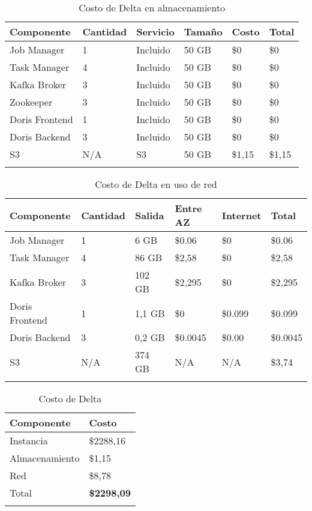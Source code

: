 \begin{longtable}{|p{3cm}|p{2cm}|p{2cm}|p{2cm}|p{2cm}|p{2cm}|}
    \hline
    \textbf{Componente} & \textbf{Cantidad} & \textbf{Servicio} & \textbf{Tamaño} & \textbf{Costo} & \textbf{Total} \\
    \hline
    Job Manager & 1 & Incluido & 50 GB & \$0 & \$0 \\
    \hline
    Task Manager & 4 & Incluido & 50 GB & \$0 & \$0 \\
    \hline
    Kafka Broker & 3 & Incluido & 50 GB & \$0 & \$0 \\
    \hline
    Zookeeper & 3 & Incluido & 50 GB & \$0 & \$0 \\
    \hline
    Doris Frontend & 1 & Incluido & 50 GB & \$0 & \$0 \\
    \hline
    Doris Backend & 3 &  Incluido & 50 GB & \$0 & \$0 \\
    \hline
    S3 & N/A & S3 & 50 GB & \$1,15 & \$1,15 \\
    \hline
    \caption{Costo de Delta en almacenamiento} \\
\end{longtable}

\begin{longtable}{|p{3cm}|p{2cm}|p{2cm}|p{2cm}|p{2cm}|p{2cm}|}
    \hline
    \textbf{Componente} & \textbf{Cantidad} & \textbf{Salida} & \textbf{Entre AZ} & \textbf{Internet} & \textbf{Total} \\
    \hline
    Job Manager & 1 & 6 GB    & \$0.06 & \$0 & \$0.06 \\
    \hline
    Task Manager & 4 & 86 GB  & \$2,58 & \$0 & \$2,58 \\
    \hline
    Kafka Broker & 3 & 102 GB  & \$2,295 & \$0 & \$2,295 \\
    \hline
    Doris Frontend & 1 & 1,1 GB  & \$0 & \$0.099 & \$0.099 \\
    \hline
    Doris Backend & 3 & 0,2 GB & \$0.0045 & \$0.00 & \$0.0045 \\
    \hline
    S3 & N/A & 374 GB & N/A & N/A & \$3,74 \\
    \hline
    \caption{Costo de Delta en uso de red} \\
\end{longtable}

\begin{longtable}{|p{3cm}|>{\raggedleft\arraybackslash}p{11cm}|}
    \hline
    \textbf{Componente} & \textbf{Costo} \\
    \hline
    Instancia & \$2288,16 \\
    \hline
    Almacenamiento & \$1,15 \\
    \hline
    Red & \$8,78 \\
    \hline
    Total & \textbf{\$2298,09} \\
    \hline
    \caption{Costo de Delta} \\
\end{longtable}

